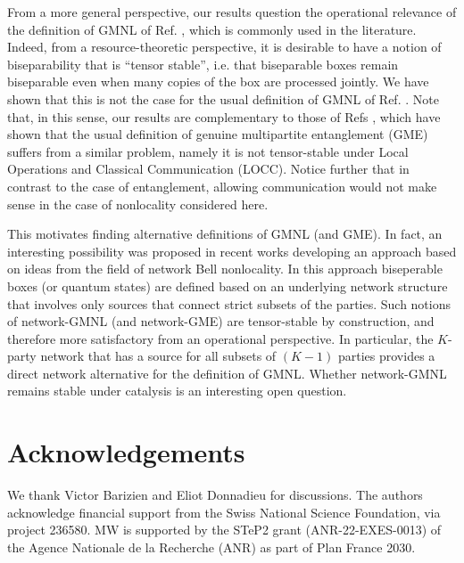 \documentclass[pra,aps,reprint,superscriptaddress]{revtex4-2}
\theoremstyle{theorem}
\begin{document}
From a more general perspective, our results question the operational relevance of the definition of GMNL of Ref. \cite{Bancal2013}, which is commonly used in the literature. Indeed, from a resource-theoretic perspective, it is desirable to have a notion of biseparability that is ``tensor stable'', i.e. that biseparable boxes remain biseparable even when many copies of the box are processed jointly. We have shown that this is not the case for the usual definition of GMNL of Ref. \cite{Bancal2013}. Note that, in this sense, our results are complementary to those of Refs \cite{Yamasaki2022,Palazuelos2022,weinbrenner2025}, which have shown that the usual definition of genuine multipartite entanglement (GME) suffers from a similar problem, namely it is not tensor-stable under Local Operations and Classical Communication (LOCC). Notice further that in contrast to the case of entanglement, allowing communication would not make sense in the case of nonlocality considered here. 

This motivates finding alternative definitions of GMNL (and GME). In fact, an interesting possibility was proposed in recent works \cite{Navascues2020,kraft2021,CoiteuxRoy2021,Coiteux2021pra} developing an approach based on ideas from the field of network Bell nonlocality. In this approach biseperable boxes (or quantum states) are defined based on an underlying network structure that involves only sources that connect strict subsets of the parties. Such notions of network-GMNL (and network-GME) are tensor-stable by construction, and therefore more satisfactory from an operational perspective. In particular, the $K$-party network that has a source for all subsets of $(K-1)$ parties provides a direct network alternative for the definition of GMNL. Whether network-GMNL remains stable under catalysis is an interesting open question. 



\section{Acknowledgements}

We thank Victor Barizien and Eliot Donnadieu for discussions. The authors acknowledge financial support from the Swiss National Science Foundation, via project 236580.
MW is supported by the STeP2 grant (ANR-22-EXES-0013) of the Agence Nationale de la Recherche (ANR) as part of Plan France 2030.



\end{document}
